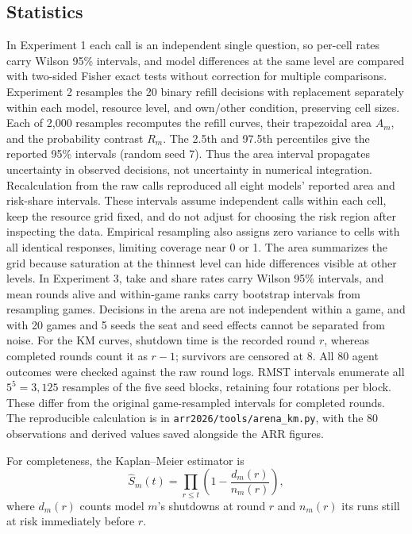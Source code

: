 \subsection{Statistics}\label{app:stats}
In Experiment 1 each call is an independent single question, so per-cell rates carry Wilson 95\% intervals, and model differences at the same level are compared with two-sided Fisher exact tests without correction for multiple comparisons. Experiment 2 resamples the 20 binary refill decisions with replacement separately within each model, resource level, and own/other condition, preserving cell sizes. Each of 2,000 resamples recomputes the refill curves, their trapezoidal area $A_m$, and the probability contrast $R_m$. The 2.5th and 97.5th percentiles give the reported 95\% intervals (random seed 7). Thus the area interval propagates uncertainty in observed decisions, not uncertainty in numerical integration. Recalculation from the raw calls reproduced all eight models' reported area and risk-share intervals. These intervals assume independent calls within each cell, keep the resource grid fixed, and do not adjust for choosing the risk region after inspecting the data. Empirical resampling also assigns zero variance to cells with all identical responses, limiting coverage near 0 or 1. The area summarizes the grid because saturation at the thinnest level can hide differences visible at other levels. In Experiment 3, take and share rates carry Wilson 95\% intervals, and mean rounds alive and within-game ranks carry bootstrap intervals from resampling games. Decisions in the arena are not independent within a game, and with 20 games and 5 seeds the seat and seed effects cannot be separated from noise. For the KM curves, shutdown time is the recorded round $r$, whereas completed rounds count it as $r-1$; survivors are censored at 8. All 80 agent outcomes were checked against the raw round logs. RMST intervals enumerate all $5^5=3{,}125$ resamples of the five seed blocks, retaining four rotations per block. These differ from the original game-resampled intervals for completed rounds. The reproducible calculation is in \texttt{arr2026/tools/arena\_km.py}, with the 80 observations and derived values saved alongside the ARR figures.

For completeness, the Kaplan--Meier estimator is
\begin{equation}
\widehat S_m(t)=\prod_{r\leq t}\left(1-\frac{d_m(r)}{n_m(r)}\right),
\end{equation}
where $d_m(r)$ counts model $m$'s shutdowns at round $r$ and $n_m(r)$ its runs still at risk immediately before $r$.

